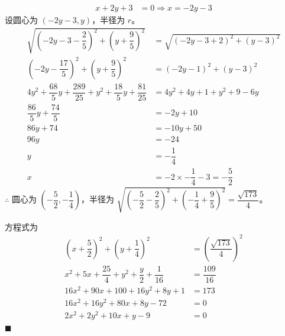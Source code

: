 \documentclass[10pt]{article}
\begin{document}
\begin{enumerate}[leftmargin=*]
        \begin{align*}
          x + 2y + 3 & = 0 \Rightarrow x = -2y - 3
        \end{align*}
        设圆心为 $(-2y-3, y)$，半径为 $r$。
        \begin{align*}
          \sqrt{\left(-2y-3-\dfrac{2}{5}\right)^{2} + \left(y+\dfrac{9}{5}\right)^{2}}        & = \sqrt{\left(-2y-3+2\right)^{2} + (y-3)^{2}} \\
          \left(-2y-\dfrac{17}{5}\right)^{2} + \left(y+\dfrac{9}{5}\right)^{2}                & = (-2y-1)^{2} + (y-3)^{2}                     \\
          4y^{2} + \dfrac{68}{5}y + \dfrac{289}{25} + y^{2} + \dfrac{18}{5}y + \dfrac{81}{25} & = 4y^{2} + 4y + 1 + y^{2} + 9 - 6y            \\
          \dfrac{86}{5}y + \dfrac{74}{5}                                                      & = - 2y + 10                                   \\
          86y + 74                                                                            & = -10y + 50                                   \\
          96y                                                                                 & = -24                                         \\
          y                                                                                   & = -\dfrac{1}{4}                               \\
          x                                                                                   & = -2 \times -\dfrac{1}{4} - 3 = -\dfrac{5}{2}
        \end{align*}
        $\therefore$ 圆心为 $\left(-\dfrac{5}{2}, -\dfrac{1}{4}\right)$，半径为 $\sqrt{\left(-\dfrac{5}{2}-\dfrac{2}{5}\right)^{2} + \left(-\dfrac{1}{4}+\dfrac{9}{5}\right)^{2}} = \dfrac{\sqrt{173}}{4}$。

        方程式为
        \begin{align*}
          \left(x+\dfrac{5}{2}\right)^{2} + \left(y+\dfrac{1}{4}\right)^{2} & = \left(\dfrac{\sqrt{173}}{4}\right)^{2} \\
          x^{2} + 5x + \dfrac{25}{4} + y^{2} + \dfrac{y}{2} + \dfrac{1}{16} & = \dfrac{109}{16}                        \\
          16x^{2} + 90x + 100 + 16y^{2} + 8y + 1                            & = 173                                    \\
          16x^{2} + 16y^{2} + 80x + 8y - 72                                 & = 0                                      \\
          2x^{2} + 2y^{2} + 10x + y - 9                                     & = 0
        \end{align*} \hfill$\blacksquare$


\end{enumerate}
\end{document}
